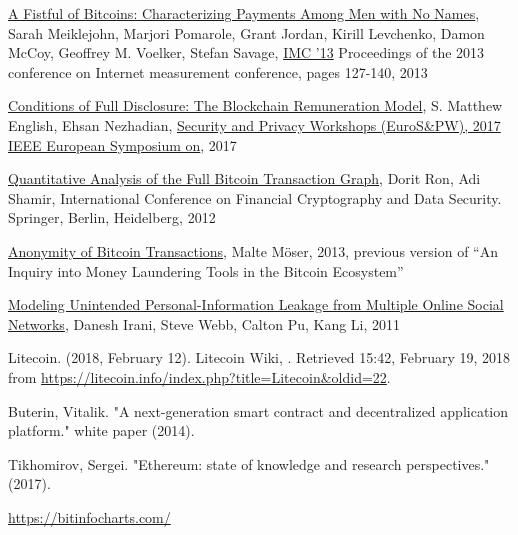 \begin{thebibliography}{1}
\href{https://cseweb.ucsd.edu/~smeiklejohn/files/imc13.pdf}{A Fistful of
Bitcoins: Characterizing Payments Among Men with No Names}, Sarah Meiklejohn,
Marjori Pomarole, Grant Jordan, Kirill Levchenko, Damon McCoy, Geoffrey M.
Voelker, Stefan Savage, 
\href{http://www.sigcomm.org/events/imc-conference/}{IMC '13} Proceedings of
the 2013 conference on Internet measurement conference, pages 127-140, 2013

\href{http://ieeexplore.ieee.org/document/7966972/}{Conditions of Full
Disclosure: The Blockchain Remuneration Model}, S. Matthew English, 
Ehsan Nezhadian,
\href{http://ieeexplore.ieee.org/xpl/mostRecentIssue.jsp?punumber=7966454}
{Security and Privacy Workshops (EuroS\&PW), 2017 IEEE European Symposium on},
2017

\href{http://arimoto.lolipop.jp/584.pdf}{Quantitative Analysis of the Full
Bitcoin Transaction Graph}, Dorit Ron, Adi Shamir, International Conference on
Financial Cryptography and Data Security. Springer, Berlin, Heidelberg, 2012

\href{https://www.wi.uni-muenster.de/sites/wi/files/public/department/itsecurity/mbc13/mbc13-moeser-paper.pdf}
{Anonymity of Bitcoin Transactions}, Malte Möser, 2013, previous version of
``An Inquiry into Money Laundering Tools in the Bitcoin Ecosystem''

\href{https://www.cc.gatech.edu/projects/doi/Papers/DIrani_InternetComp_2011.pdf
}{Modeling Unintended Personal-Information Leakage from Multiple Online Social
Networks}, Danesh Irani, Steve Webb, Calton Pu, Kang Li, 2011

Litecoin. (2018, February 12). Litecoin Wiki, . Retrieved
15:42, February 19, 2018
from \url{https://litecoin.info/index.php?title=Litecoin&oldid=22}.

Buterin, Vitalik. "A next-generation smart contract and decentralized
application platform." white paper (2014).

Tikhomirov, Sergei. "Ethereum: state of knowledge and research perspectives."
(2017).

\url{https://bitinfocharts.com/}

\end{thebibliography}

